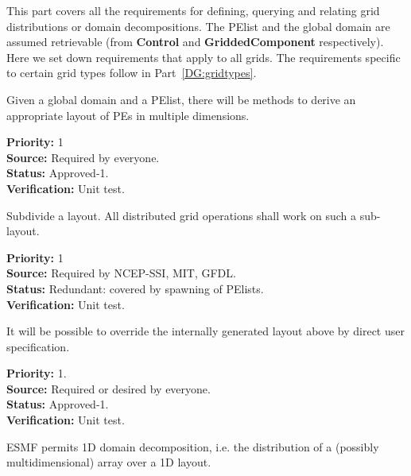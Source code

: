 
This part covers all the requirements for defining, querying and
relating grid distributions or domain decompositions. The PElist and
the global domain are assumed retrievable (from \textbf{Control} and
\textbf{GriddedComponent} respectively). Here we set down requirements
that apply to all grids. The requirements specific to certain grid
types follow in Part~\ref{DG:gridtypes}.



Given a global domain and a PElist, there will be methods to derive an
appropriate layout of PEs in multiple dimensions.

\begin{reqlist}
{\bf Priority:} 1\\
{\bf Source:} Required by everyone. \\
{\bf Status:} Approved-1. \\
{\bf Verification:} Unit test.
\end{reqlist}


Subdivide a layout.  All distributed grid operations shall work 
on such a sub-layout.

\begin{reqlist}
{\bf Priority:} 1 \\
{\bf Source:} Required by NCEP-SSI, MIT, GFDL. \\
{\bf Status:} Redundant: covered by spawning of PElists. \\
{\bf Verification:} Unit test.
\end{reqlist}


It will be possible to override the internally generated layout above
by direct user specification.

\begin{reqlist}
{\bf Priority:} 1. \\ 
{\bf Source:} Required or desired by everyone. \\
{\bf Status:} Approved-1. \\
{\bf Verification:} Unit test.
\end{reqlist}


ESMF permits 1D domain decomposition, i.e. the distribution of a
(possibly multidimensional) array over a 1D layout.

